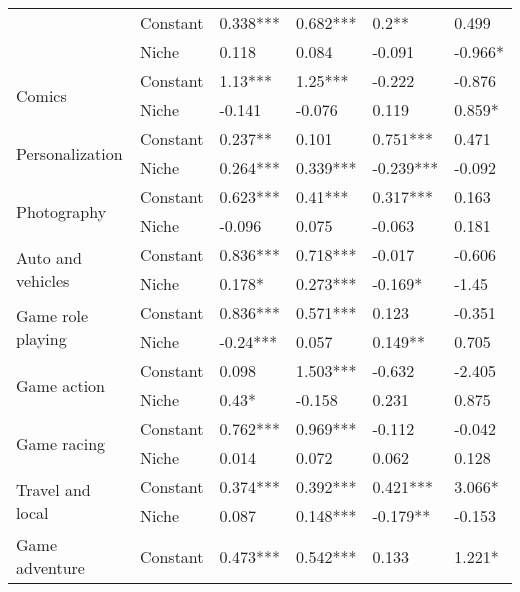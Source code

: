\begin{longtable}[h!]{llllll}
\bottomrule
\endlastfoot
\multirow{2}{*}{Art and design} & Constant &            0.338*** &    0.682*** &      0.2** &      0.499 \\
          & Niche &               0.118 &       0.084 &     -0.091 &    -0.966* \\
\cline{1-6}
\multirow{2}{*}{Comics} & Constant &             1.13*** &     1.25*** &     -0.222 &     -0.876 \\
          & Niche &              -0.141 &      -0.076 &      0.119 &     0.859* \\
\cline{1-6}
\multirow{2}{*}{Personalization} & Constant &             0.237** &       0.101 &   0.751*** &      0.471 \\
          & Niche &            0.264*** &    0.339*** &  -0.239*** &     -0.092 \\
\cline{1-6}
\multirow{2}{*}{Photography} & Constant &            0.623*** &     0.41*** &   0.317*** &      0.163 \\
          & Niche &              -0.096 &       0.075 &     -0.063 &      0.181 \\
\cline{1-6}
\multirow{2}{*}{Auto and vehicles} & Constant &            0.836*** &    0.718*** &     -0.017 &     -0.606 \\
          & Niche &              0.178* &    0.273*** &    -0.169* &      -1.45 \\
\cline{1-6}
\multirow{2}{*}{Game role playing} & Constant &            0.836*** &    0.571*** &      0.123 &     -0.351 \\
          & Niche &            -0.24*** &       0.057 &    0.149** &      0.705 \\
\cline{1-6}
\multirow{2}{*}{Game action} & Constant &               0.098 &    1.503*** &     -0.632 &     -2.405 \\
          & Niche &               0.43* &      -0.158 &      0.231 &      0.875 \\
\cline{1-6}
\multirow{2}{*}{Game racing} & Constant &            0.762*** &    0.969*** &     -0.112 &     -0.042 \\
          & Niche &               0.014 &       0.072 &      0.062 &      0.128 \\
\cline{1-6}
\multirow{2}{*}{Travel and local} & Constant &            0.374*** &    0.392*** &   0.421*** &     3.066* \\
          & Niche &               0.087 &    0.148*** &   -0.179** &     -0.153 \\
\cline{1-6}
\multirow{2}{*}{Game adventure} & Constant &            0.473*** &    0.542*** &      0.133 &     1.221* \\

\end{longtable}
